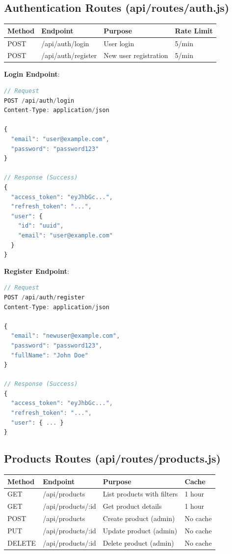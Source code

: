\documentclass[12pt,a4paper]{report}
\begin{document}
\subsection{Authentication Routes (api/routes/auth.js)}

\begin{longtable}{|p{2cm}|p{2.5cm}|p{2.5cm}|p{3cm}|}
\hline
\textbf{Method} & \textbf{Endpoint} & \textbf{Purpose} & \textbf{Rate Limit} \\
\hline
POST & /api/auth/login & User login & 5/min \\
\hline
POST & /api/auth/register & New user registration & 5/min \\
\hline
\end{longtable}

\textbf{Login Endpoint}:
\begin{lstlisting}[language=javascript, caption=Login Request/Response]
// Request
POST /api/auth/login
Content-Type: application/json

{
  "email": "user@example.com",
  "password": "password123"
}

// Response (Success)
{
  "access_token": "eyJhbGc...",
  "refresh_token": "...",
  "user": {
    "id": "uuid",
    "email": "user@example.com"
  }
}
\end{lstlisting}

\textbf{Register Endpoint}:
\begin{lstlisting}[language=javascript, caption=Register Request/Response]
// Request
POST /api/auth/register
Content-Type: application/json

{
  "email": "newuser@example.com",
  "password": "password123",
  "fullName": "John Doe"
}

// Response (Success)
{
  "access_token": "eyJhbGc...",
  "refresh_token": "...",
  "user": { ... }
}
\end{lstlisting}

\subsection{Products Routes (api/routes/products.js)}

\begin{longtable}{|p{2cm}|p{3cm}|p{3cm}|p{2.5cm}|}
\hline
\textbf{Method} & \textbf{Endpoint} & \textbf{Purpose} & \textbf{Cache} \\
\hline
GET & /api/products & List products with filters & 1 hour \\
\hline
GET & /api/products/:id & Get product details & 1 hour \\
\hline
POST & /api/products & Create product (admin) & No cache \\
\hline
PUT & /api/products/:id & Update product (admin) & No cache \\
\hline
DELETE & /api/products/:id & Delete product (admin) & No cache \\
\hline
\end{longtable}
\end{document}

